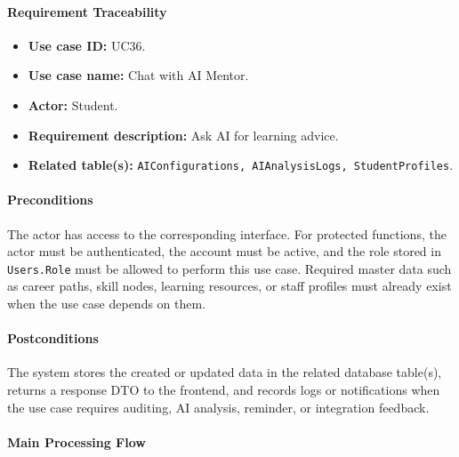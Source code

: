 \paragraph{Requirement Traceability}

\begin{itemize}
    \item \textbf{Use case ID:} UC36.
    \item \textbf{Use case name:} Chat with AI Mentor.
    \item \textbf{Actor:} Student.
    \item \textbf{Requirement description:} Ask AI for learning advice.
    \item \textbf{Related table(s):} \texttt{AIConfigurations, AIAnalysisLogs, StudentProfiles}.
\end{itemize}

\paragraph{Preconditions}

The actor has access to the corresponding interface. For protected functions, the actor must be authenticated, the account must be active, and the role stored in \texttt{Users.Role} must be allowed to perform this use case. Required master data such as career paths, skill nodes, learning resources, or staff profiles must already exist when the use case depends on them.

\paragraph{Postconditions}

The system stores the created or updated data in the related database table(s), returns a response DTO to the frontend, and records logs or notifications when the use case requires auditing, AI analysis, reminder, or integration feedback.

\paragraph{Main Processing Flow}

